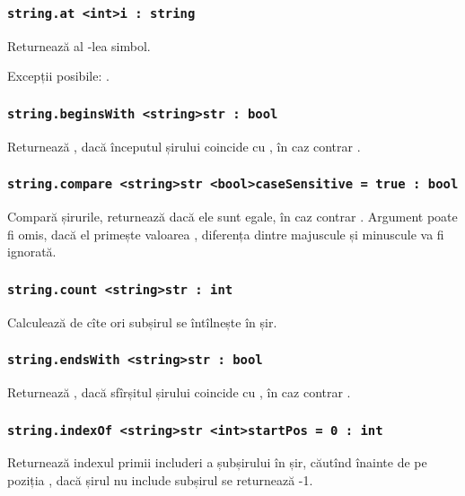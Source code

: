 \subsubsection{\lstinline|string.at <int>i : string|}

Returnează al -lea simbol.

Excepții posibile: .

\subsubsection{\lstinline|string.beginsWith <string>str : bool|}

Returnează \true{}, dacă începutul șirului coincide cu , în caz contrar \false{}.

\subsubsection{\lstinline|string.compare <string>str <bool>caseSensitive = true : bool|}

Compară șirurile, returnează \true{} dacă ele sunt egale, în caz contrar \false{}. Argument  poate fi omis, dacă el primește valoarea \false{}, diferența dintre majuscule și minuscule va fi ignorată.

\subsubsection{\lstinline|string.count <string>str : int|}

Calculează de cîte ori subșirul  se întîlnește în șir.

\subsubsection{\lstinline|string.endsWith <string>str : bool|}

Returnează \true{}, dacă sfîrșitul șirului coincide cu , în caz contrar \false{}.

\subsubsection{\lstinline|string.indexOf <string>str <int>startPos = 0 : int|}

Returnează indexul primii includeri a șubșirului  în șir, căutînd înainte de pe poziția , dacă șirul nu include subșirul se returnează -1.

